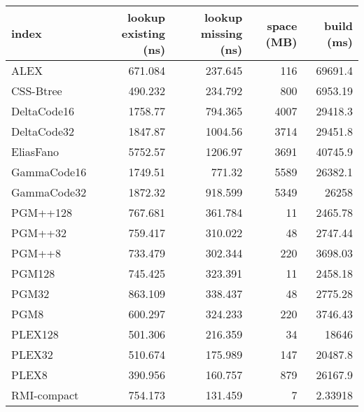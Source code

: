 \begin{tabular}{lrrrr}
\hline
 index             &   lookup existing (ns) &   lookup missing (ns) &   space (MB) &      build (ms) \\
\hline
 ALEX              &                671.084 &               237.645 &          116 &  69691.4        \\
 CSS-Btree         &                490.232 &               234.792 &          800 &   6953.19       \\
 DeltaCode16       &               1758.77  &               794.365 &         4007 &  29418.3        \\
 DeltaCode32       &               1847.87  &              1004.56  &         3714 &  29451.8        \\
 EliasFano         &               5752.57  &              1206.97  &         3691 &  40745.9        \\
 GammaCode16       &               1749.51  &               771.32  &         5589 &  26382.1        \\
 GammaCode32       &               1872.32  &               918.599 &         5349 &  26258          \\
 PGM++128          &                767.681 &               361.784 &           11 &   2465.78       \\
 PGM++32           &                759.417 &               310.022 &           48 &   2747.44       \\
 PGM++8            &                733.479 &               302.344 &          220 &   3698.03       \\
 PGM128            &                745.425 &               323.391 &           11 &   2458.18       \\
 PGM32             &                863.109 &               338.437 &           48 &   2775.28       \\
 PGM8              &                600.297 &               324.233 &          220 &   3746.43       \\
 PLEX128           &                501.306 &               216.359 &           34 &  18646          \\
 PLEX32            &                510.674 &               175.989 &          147 &  20487.8        \\
 PLEX8             &                390.956 &               160.757 &          879 &  26167.9        \\
 RMI-compact       &                754.173 &               131.459 &            7 &      2.33918    \\

\end{tabular}
